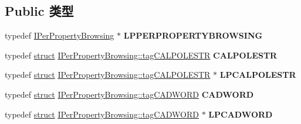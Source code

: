 \subsection*{Public 类型}
\begin{DoxyCompactItemize}
\item 
\mbox{\label{interface_i_per_property_browsing_a985c6262e94cb74f79b3852c40bcff3f}} 
typedef \hyperlink{interface_i_per_property_browsing}{I\+Per\+Property\+Browsing} $\ast$ {\bfseries L\+P\+P\+E\+R\+P\+R\+O\+P\+E\+R\+T\+Y\+B\+R\+O\+W\+S\+I\+NG}
\item 
\mbox{\label{interface_i_per_property_browsing_a78e0b9fddde609287124e17ad0162eff}} 
typedef \hyperlink{interfacestruct}{struct} \hyperlink{struct_i_per_property_browsing_1_1tag_c_a_l_p_o_l_e_s_t_r}{I\+Per\+Property\+Browsing\+::tag\+C\+A\+L\+P\+O\+L\+E\+S\+TR} {\bfseries C\+A\+L\+P\+O\+L\+E\+S\+TR}
\item 
\mbox{\label{interface_i_per_property_browsing_ada74908d9f4d90f4a768cde031048ad0}} 
typedef \hyperlink{interfacestruct}{struct} \hyperlink{struct_i_per_property_browsing_1_1tag_c_a_l_p_o_l_e_s_t_r}{I\+Per\+Property\+Browsing\+::tag\+C\+A\+L\+P\+O\+L\+E\+S\+TR} $\ast$ {\bfseries L\+P\+C\+A\+L\+P\+O\+L\+E\+S\+TR}
\item 
\mbox{\label{interface_i_per_property_browsing_a353dcecd2849b2e7290119ec0e643876}} 
typedef \hyperlink{interfacestruct}{struct} \hyperlink{struct_i_per_property_browsing_1_1tag_c_a_d_w_o_r_d}{I\+Per\+Property\+Browsing\+::tag\+C\+A\+D\+W\+O\+RD} {\bfseries C\+A\+D\+W\+O\+RD}
\item 
\mbox{\label{interface_i_per_property_browsing_a0f05801c15c30381450cff0f47ec4770}} 
typedef \hyperlink{interfacestruct}{struct} \hyperlink{struct_i_per_property_browsing_1_1tag_c_a_d_w_o_r_d}{I\+Per\+Property\+Browsing\+::tag\+C\+A\+D\+W\+O\+RD} $\ast$ {\bfseries L\+P\+C\+A\+D\+W\+O\+RD}
\end{DoxyCompactItemize}
